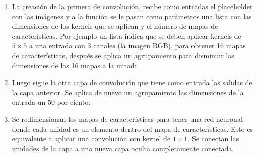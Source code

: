 \begin{enumerate}

\item La creación de la primera de convolución, recibe como entradas el placeholder
con las imágenes y a la función se le pasan como parámetros una lista con las dimensiones
de los kernels que se aplican y el número de mapas de características. Por ejemplo
un lista \sphinxcode{\sphinxupquote{{[}5, 5, 3, 16{]}}} indica que se deben aplicar kernels de $5 \times 5$ a
una entrada con 3 canales (la imagen RGB), para obtener
16 mapas de características, después se aplica un agrupamiento para disminuir las
dimensiones de los 16 mapas a la mitad:

%
\begin{sphinxVerbatim}[commandchars=\\\{\}]
   
  
\end{sphinxVerbatim}

\item Luego sigue la otra capa de convolución que tiene como entrada las salidas
de la capa anterior. Se aplica de nuevo un agrupamiento las dimensiones de la entrada un $50$ por ciento:

%
\begin{sphinxVerbatim}[commandchars=\\\{\}]
   
  
\end{sphinxVerbatim}

\item Se redimensionan los
mapas de características para tener una red neuronal donde cada unidad es un
elemento dentro del mapa de 
características. Esto es equivalente a aplicar
una convolución con kernel de $1 \times 1$. 
Se conectan las unidades de la capa a una nueva capa oculta
completamente conectada.

%
\begin{sphinxVerbatim}[commandchars=\\\{\}]
   \PYG{p}{[}     \PYG{p}{]}
   
\end{sphinxVerbatim}


\end{enumerate}
